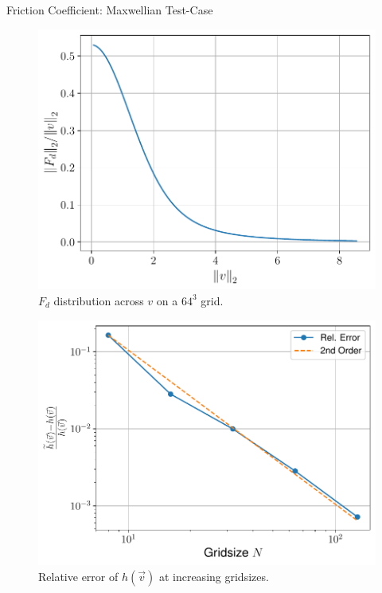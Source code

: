 \begin{frame}[c]{Friction Coefficient: Maxwellian Test-Case}
    \begin{multicols}{2}
    \begin{figure}[!htb]
        \centering
        \captionsetup{justification=centering}
      \includegraphics[width=1.03\linewidth]{figures/Fd_asymptotic_behavior_linear.pdf}
      \caption{$F_d$ distribution across $v$ on a $64^3$ grid.}
      \label{fig:Fd_asymptotic_behavior}
    \end{figure}
    \columnbreak
    \begin{figure}[!htb]
        \centering
        \captionsetup{justification=centering}
      \includegraphics[width=1.03\linewidth]{figures/Fd_error_convergence.pdf}
      \caption{Relative error of $h(\vec v)$ at increasing gridsizes.}
      \label{fig:Fd_error_convergence}
    \end{figure}
    \end{multicols}
\end{frame}

